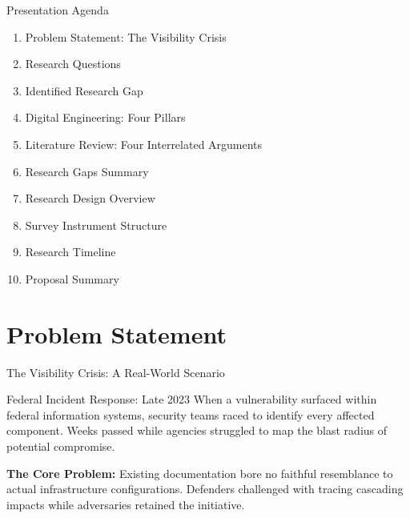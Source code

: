 \documentclass{beamer}
\begin{document}
\begin{frame}{Presentation Agenda}
  \begin{enumerate}
    \item Problem Statement: The Visibility Crisis
    \item Research Questions
    \item Identified Research Gap
    \item Digital Engineering: Four Pillars
    \item Literature Review: Four Interrelated Arguments
    \item Research Gaps Summary
    \item Research Design Overview
    \item Survey Instrument Structure
    \item Research Timeline
    \item Proposal Summary
  \end{enumerate}
\end{frame}


\section{Problem Statement}
\begin{frame}[allowframebreaks]{The Visibility Crisis: A Real-World Scenario}
  \begin{block}{Federal Incident Response: Late 2023}
    When a vulnerability surfaced within federal information systems, security teams raced to identify every affected component. Weeks passed while agencies struggled to map the blast radius of potential compromise.
  \end{block}

  \vspace{0.3cm}
  \textbf{The Core Problem:} Existing documentation bore no faithful resemblance to actual infrastructure configurations. Defenders challenged with tracing cascading impacts while adversaries retained the initiative.
\end{frame}

\end{document}
